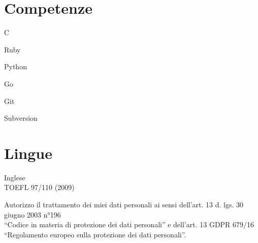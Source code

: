 \documentclass[]{deedy-resume-openfont}
\begin{document}
\begin{minipage}[t]{0.90\textwidth}
\section{Competenze}
\vspace*{4mm}
\begin{tightemize}
  \item C
  \item Ruby
  \item Python 
  \item Go
\end{tightemize}
\vspace*{4mm}
\vspace*{4mm}
\begin{tightemize}
  \item Git
  \item Subversion
\end{tightemize}

\vspace*{10mm}

\section{Lingue}
\vspace*{4mm}
Inglese \\ TOEFL 97/110 (2009) 


\vspace*{12mm}
Autorizzo il trattamento dei miei dati personali ai sensi dell’art. 13 d. lgs. 30 giugno 2003 n°196 \\ “Codice in materia di protezione dei dati personali” e dell’art. 13 GDPR 679/16 \\ “Regolamento europeo sulla protezione dei dati personali”.


\hfill
\end{minipage} %
\end{document}
